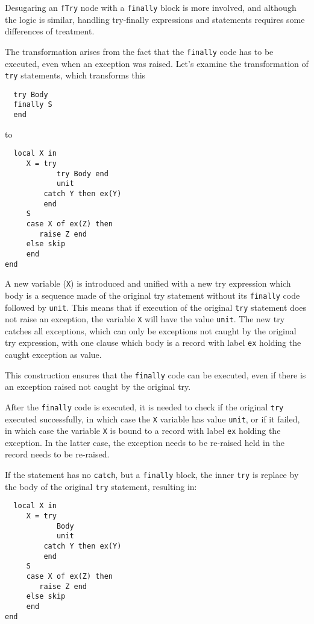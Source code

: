 \documentclass[a4paper]{memoir}
\begin{document}
Desugaring an \lstinline!fTry! node with a \lstinline!finally! block is more
involved, and although the logic is similar, handling try-finally expressions and
statements requires some differences of treatment.

The transformation arises from the fact that the \lstinline!finally! code has to
be executed, even when an exception was raised.
Let's examine the transformation of \lstinline!try! statements, which
transforms this

\begin{lstlisting}
  try Body
  finally S 
  end
\end{lstlisting}

to

\begin{lstlisting}
  local X in 
     X = try 
            try Body end 
            unit 
         catch Y then ex(Y)
         end 
     S 
     case X of ex(Z) then 
        raise Z end 
     else skip 
     end 
end  
\end{lstlisting}


A new variable (\lstinline!X!) is introduced and unified with a new try
expression which body is a sequence made of the original try statement
without its \lstinline!finally! code followed by \lstinline!unit!.
This means that if execution of the original \lstinline!try! statement does not raise an
exception, the variable \lstinline!X! will have the value \lstinline!unit!.
The new try catches all exceptions, which can only be exceptions not caught
by the original try expression, with one clause which body is a record with label
\lstinline!ex! holding the caught exception as value.

This construction ensures that the \lstinline!finally! code can be executed,
even if there is an exception raised not caught by the original try.

After the \lstinline!finally! code is executed, it is needed to check if the
original \lstinline!try! executed successfully, in which case the \lstinline!X!
variable has value \lstinline!unit!, or if it failed, in which case the variable
\lstinline!X! is bound to a record with label \lstinline!ex! holding the
exception. In the latter case, the exception needs to be re-raised held in the
record needs to be re-raised.

If the statement has no \lstinline!catch!, but a \lstinline!finally! block, the
inner \lstinline!try! is replace by the body of the original \lstinline!try!
statement, resulting in:
\begin{lstlisting}
  local X in 
     X = try 
            Body
            unit 
         catch Y then ex(Y)
         end 
     S 
     case X of ex(Z) then 
        raise Z end 
     else skip 
     end 
end  
\end{lstlisting}
\end{document}
